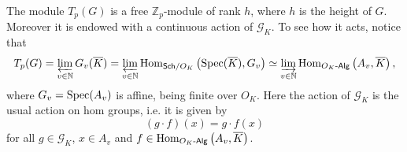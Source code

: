 \begin{rem}[]\label{rem:TateModuleProperties}
	The module $T_p(G)$ is a free $\mathbb{Z}_{p}$-module of rank $h$,
	where $h$ is the height of $G$.
	Moreover it is endowed with a continuous action of $\mathscr{G}_K$.
	To see how it acts, notice that
	\begin{equation*}
		T_p(G) = \varprojlim_{v \in \mathbb{N}} G_v(\overline{K}) =
		\varprojlim_{v \in \mathbb{N}} \operatorname{Hom}_{ \mathsf{Sch}/O_K } 
		\left( \operatorname{Spec}(\overline{K}), G_v \right) \simeq
		\varinjlim_{v \in \mathbb{N}} \operatorname{Hom}_{ O_K\text{-}\mathsf{Alg} }
		\left( A_v, \overline{K} \right)
	,\end{equation*}
	where $G_v = \operatorname{Spec}(A_v)$ is affine, being finite over $O_K$.
	Here the action of $\mathscr{G}_K$ is the usual action on hom
	groups, i.e$.$ it is given by
	\begin{equation*}
		\left( g \cdot f \right)(x) = g \cdot f(x)
	\end{equation*}
	for all $g \in \mathscr{G}_K$, $x \in A_v$ and $f \in \operatorname{Hom}_{ O_K\text{-}\mathsf{Alg} } 
	\left( A_v, \overline{K}\right)$.
\end{rem}


